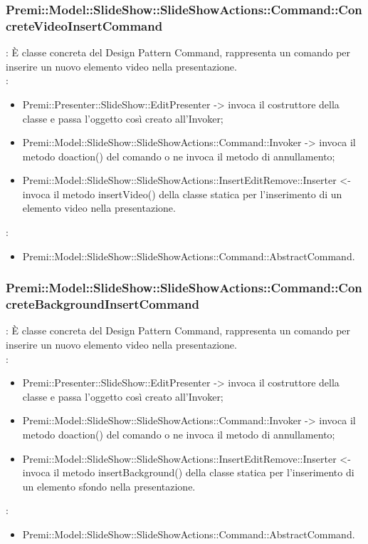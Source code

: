 {                \subsubsection{Premi::Model::SlideShow::SlideShowActions::Command::ConcreteVideoInsertCommand}{
				\textbf{\tipo}: È classe concreta del Design Pattern Command, rappresenta un comando per inserire un nuovo elemento video nella presentazione.\\	
				\textbf{\relaz}: 
				\begin{itemize}
					\item Premi::Presenter::SlideShow::EditPresenter -> invoca il costruttore della classe e passa l’oggetto così creato all’Invoker;
					\item Premi::Model::SlideShow::SlideShowActions::Command::Invoker -> invoca il metodo doaction() del comando o ne invoca il metodo di annullamento;
                    \item Premi::Model::SlideShow::SlideShowActions::InsertEditRemove::Inserter <- invoca il metodo insertVideo() della classe statica per l’inserimento di un elemento video nella presentazione.
				\end{itemize}	
                \textbf{\base}: 
                    \begin{itemize}
                    \item Premi::Model::SlideShow::SlideShowActions::Command::AbstractCommand.
                    \end{itemize}
                    }
                \subsubsection{Premi::Model::SlideShow::SlideShowActions::Command::ConcreteBackgroundInsertCommand}{
				\textbf{\tipo}: È classe concreta del Design Pattern Command, rappresenta un comando per inserire un nuovo elemento video nella presentazione.\\	
				\textbf{\relaz}: 
				\begin{itemize}
					\item Premi::Presenter::SlideShow::EditPresenter -> invoca il costruttore della classe e passa l’oggetto così creato all’Invoker;
					\item Premi::Model::SlideShow::SlideShowActions::Command::Invoker -> invoca il metodo doaction() del comando o ne invoca il metodo di annullamento;
                    \item Premi::Model::SlideShow::SlideShowActions::InsertEditRemove::Inserter <- invoca il metodo insertBackground() della classe statica per l’inserimento di un elemento sfondo nella presentazione.
				\end{itemize}
                \textbf{\base}: 
                    \begin{itemize}
                    \item Premi::Model::SlideShow::SlideShowActions::Command::AbstractCommand.
                    \end{itemize}
                    }        
}
